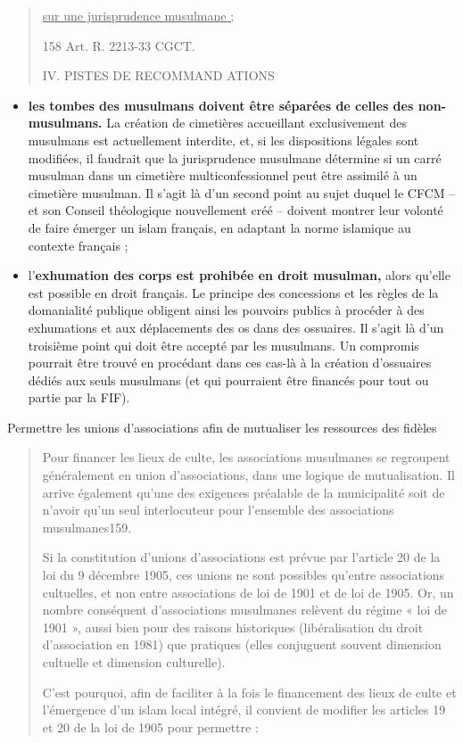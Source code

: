 \begin{quote}
\underline{sur une jurisprudence musulmane ;}

158 Art. R. 2213-33 CGCT.

IV. PISTES DE RECOMMAND ATIONS
\end{quote}

\begin{itemize}
\item
  \textbf{les tombes des musulmans doivent être séparées de celles des
  non-musulmans.} La création de cimetières accueillant exclusivement
  des musulmans est actuellement interdite, et, si les dispositions
  légales sont modifiées, il faudrait que la jurisprudence musulmane
  détermine si un carré musulman dans un cimetière multiconfessionnel
  peut être assimilé à un cimetière musulman. Il s'agit là d'un second
  point au sujet duquel le CFCM -- et son Conseil théologique
  nouvellement créé -- doivent montrer leur volonté de faire émerger un
  islam français, en adaptant la norme islamique au contexte français ;
\item
  l'\textbf{exhumation des corps est prohibée en droit musulman,} alors
  qu'elle est possible en droit français. Le principe des concessions et
  les règles de la domanialité publique obligent ainsi les pouvoirs
  publics à procéder à des exhumations et aux déplacements des os dans
  des ossuaires. Il s'agit là d'un troisième point qui doit être accepté
  par les musulmans. Un compromis pourrait être trouvé en procédant dans
  ces cas-là à la création d'ossuaires dédiés aux seuls musulmans (et
  qui pourraient être financés pour tout ou partie par la FIF).
\end{itemize}

Permettre les unions d'associations afin de mutualiser les ressources
des fidèles

\begin{quote}
Pour financer les lieux de culte, les associations musulmanes se
regroupent généralement en union d'associations, dans une logique de
mutualisation. Il arrive également qu'une des exigences préalable de la
municipalité soit de n'avoir qu'un seul interlocuteur pour l'ensemble
des associations musulmanes159.

Si la constitution d'unions d'associations est prévue par l'article 20
de la loi du 9 décembre 1905, ces unions ne sont possibles qu'entre
associations cultuelles, et non entre associations de loi de 1901 et de
loi de 1905. Or, un nombre conséquent d'associations musulmanes relèvent
du régime « loi de 1901 », aussi bien pour des raisons historiques
(libéralisation du droit d'association en 1981) que pratiques (elles
conjuguent souvent dimension cultuelle et dimension culturelle).

C'est pourquoi, afin de faciliter à la fois le financement des lieux de
culte et l'émergence d'un islam local intégré, il convient de modifier
les articles 19 et 20 de la loi de 1905 pour permettre :
\end{quote}

